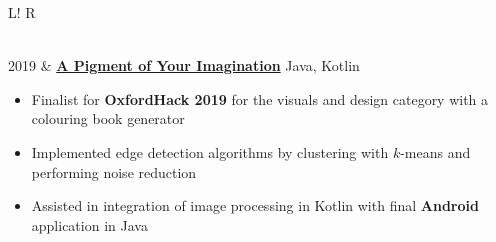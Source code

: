 \documentclass[10pt, a4paper]{article}
\newcommand\vsep{\color{lightgray} \vrule width 0.5pt}
\newcommand\itemizespace{\vspace{-0.65\baselineskip}}
\newcommand\tspace{\hfill}
\begin{document}
\begin{tabular}{L!{\vsep}R}
\begin{itemize}[label=\raisebox{0.25ex}{\tiny$\bullet$}]
                        \itemizespace
                    \end{itemize} \\
                2019 & \href{https://devpost.com/software/bucket-hsk7a1}{\textbf{A Pigment of Your Imagination}} \tspace Java, Kotlin
                    \begin{itemize}[label=\raisebox{0.25ex}{\tiny$\bullet$}]
                        \setlength{\itemindent}{-0.125in}
                        \item Finalist for \textbf{OxfordHack 2019} for the visuals and design category with a colouring book generator
                        \item Implemented edge detection algorithms by clustering with $k$-means and performing noise reduction
                        \item Assisted in integration of image processing in Kotlin with final \textbf{Android} application in Java
                        \itemizespace
                    \end{itemize} \\

\end{tabular}
\end{document}
